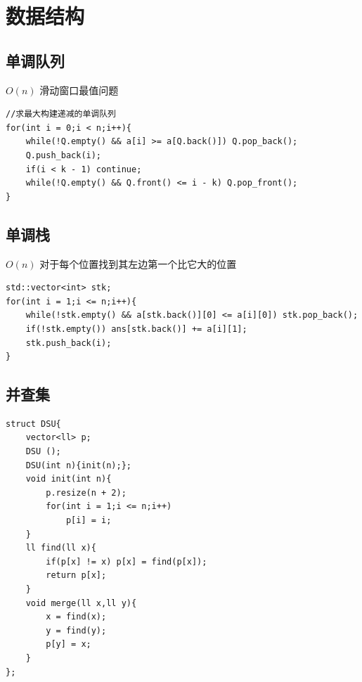 \section{数据结构}
\subsection{单调队列}
$O(n)$ 滑动窗口最值问题
\begin{lstlisting}[caption={}]
//求最大构建递减的单调队列 
for(int i = 0;i < n;i++){
	while(!Q.empty() && a[i] >= a[Q.back()]) Q.pop_back();
	Q.push_back(i);
    if(i < k - 1) continue;
	while(!Q.empty() && Q.front() <= i - k) Q.pop_front();
}
\end{lstlisting}


\subsection{单调栈}
$O(n)$ 对于每个位置找到其左边第一个比它大的位置
\begin{lstlisting}[caption={}]
std::vector<int> stk;
for(int i = 1;i <= n;i++){
	while(!stk.empty() && a[stk.back()][0] <= a[i][0]) stk.pop_back();
	if(!stk.empty()) ans[stk.back()] += a[i][1];
	stk.push_back(i);
}
\end{lstlisting}

\subsection{并查集}
\begin{lstlisting}[caption={}]
struct DSU{
    vector<ll> p;
    DSU ();
    DSU(int n){init(n);};
    void init(int n){
        p.resize(n + 2);
        for(int i = 1;i <= n;i++)
            p[i] = i;
    }
    ll find(ll x){
        if(p[x] != x) p[x] = find(p[x]);
        return p[x];
    }
    void merge(ll x,ll y){
        x = find(x);
        y = find(y);
        p[y] = x;
    }
};
\end{lstlisting}

